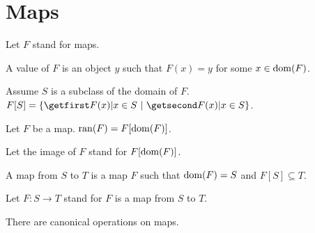 \documentclass{article}
\begin{document}
\section{Maps}
%
\begin{forthel}

Let $F$ stand for maps.

\begin{definition}
A value of $F$ is an object $y$ such
that $F(x) = y$ for some $x \in \operatorname{dom}(F)$.
\end{definition}


  \begin{definition}
    Assume $S$ is a subclass of the domain of $F$.
    $F[S] = \class{F(x) | x \in S}$.
  \end{definition}

\begin{definition}
Let $F$ be a map. $\operatorname{ran}(F) = F[\operatorname{dom}(F)]$.
\end{definition}


  Let the image of $F$ stand for $F[\operatorname{dom}(F)]$.

\begin{definition}
    A map from $S$ to $T$ is a map $F$ such that $\operatorname{dom}(F) = S$ 
and $F[S]  \subseteq T$.
  \end{definition}

Let $F : S \rightarrow T$ stand for $F$ is a map from $S$ to $T$.
%
\end{forthel}
%
There are canonical operations on maps.
%
\end{document}
